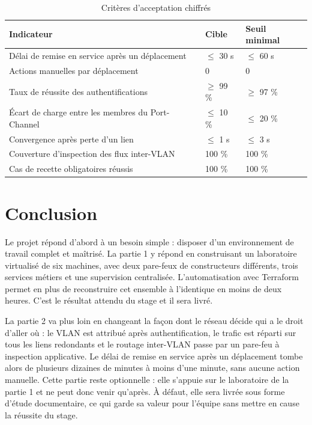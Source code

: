 \documentclass[11pt,a4paper]{article}
\newcommand{\bloc}[1]{\markboth{#1}{}}
\begin{document}
\begin{table}[H]
\centering
\caption{Critères d'acceptation chiffrés}
\begin{tabularx}{\textwidth}{Y C{3.0cm} C{3.0cm}}
\toprule
{}\textbf{Indicateur} & \textbf{Cible} & \textbf{Seuil minimal} \\
\midrule
Délai de remise en service après un déplacement & $\leq$ 30 s & $\leq$ 60 s \\
Actions manuelles par déplacement & 0 & 0 \\
Taux de réussite des authentifications & $\geq$ 99 \% & $\geq$ 97 \% \\
Écart de charge entre les membres du Port-Channel & $\leq$ 10 \% & $\leq$ 20 \% \\
Convergence après perte d'un lien & $\leq$ 1 s & $\leq$ 3 s \\
Couverture d'inspection des flux inter-VLAN & 100 \% & 100 \% \\
Cas de recette obligatoires réussis & 100 \% & 100 \% \\
\bottomrule
\end{tabularx}
\end{table}

\bloc{Conclusion}
\section{Conclusion}
Le projet répond d'abord à un besoin simple : disposer d'un environnement de travail complet et maîtrisé. La partie 1 y répond en construisant un laboratoire virtualisé de six machines, avec deux pare-feux de constructeurs différents, trois services métiers et une supervision centralisée. L'automatisation avec Terraform permet en plus de reconstruire cet ensemble à l'identique en moins de deux heures. C'est le résultat attendu du stage et il sera livré.

La partie 2 va plus loin en changeant la façon dont le réseau décide qui a le droit d'aller où : le VLAN est attribué après authentification, le trafic est réparti sur tous les liens redondants et le routage inter-VLAN passe par un pare-feu à inspection applicative. Le délai de remise en service après un déplacement tombe alors de plusieurs dizaines de minutes à moins d'une minute, sans aucune action manuelle. Cette partie reste optionnelle : elle s'appuie sur le laboratoire de la partie 1 et ne peut donc venir qu'après. À défaut, elle sera livrée sous forme d'étude documentaire, ce qui garde sa valeur pour l'équipe sans mettre en cause la réussite du stage.
\end{document}
